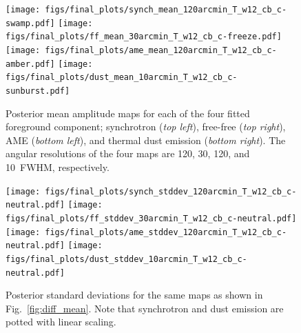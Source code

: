\documentclass[twocolumn]{aa}
\begin{document}
\begin{figure}[p]
  \center	
  \texttt{[image: figs/final\_plots/synch\_mean\_120arcmin\_T\_w12\_cb\_c-swamp.pdf]}
  \texttt{[image: figs/final\_plots/ff\_mean\_30arcmin\_T\_w12\_cb\_c-freeze.pdf]}\\
  \texttt{[image: figs/final\_plots/ame\_mean\_120arcmin\_T\_w12\_cb\_c-amber.pdf]}
  \texttt{[image: figs/final\_plots/dust\_mean\_10arcmin\_T\_w12\_cb\_c-sunburst.pdf]}
  \caption{Posterior mean amplitude maps for each of the four fitted
    foreground component; synchrotron (\emph{top left}), free-free
    (\emph{top right}), AME (\emph{bottom left}), and thermal dust
    emission (\emph{bottom right}). The angular resolutions of the
    four maps are 120, 30, 120, and 10\arcm\ FWHM, respectively.
  }
  \label{fig:diff_mean}
\vspace*{3mm}
  \center	
  \texttt{[image: figs/final\_plots/synch\_stddev\_120arcmin\_T\_w12\_cb\_c-neutral.pdf]}
  \texttt{[image: figs/final\_plots/ff\_stddev\_30arcmin\_T\_w12\_cb\_c-neutral.pdf]}\\
  \texttt{[image: figs/final\_plots/ame\_stddev\_120arcmin\_T\_w12\_cb\_c-neutral.pdf]}
  \texttt{[image: figs/final\_plots/dust\_stddev\_10arcmin\_T\_w12\_cb\_c-neutral.pdf]}
  \caption{Posterior standard deviations for the same maps as shown in
    Fig.~\ref{fig:diff_mean}. Note that synchrotron and dust emission are potted
    with linear scaling.
  }
  \label{fig:diff_rms}
\end{figure}
\end{document}
